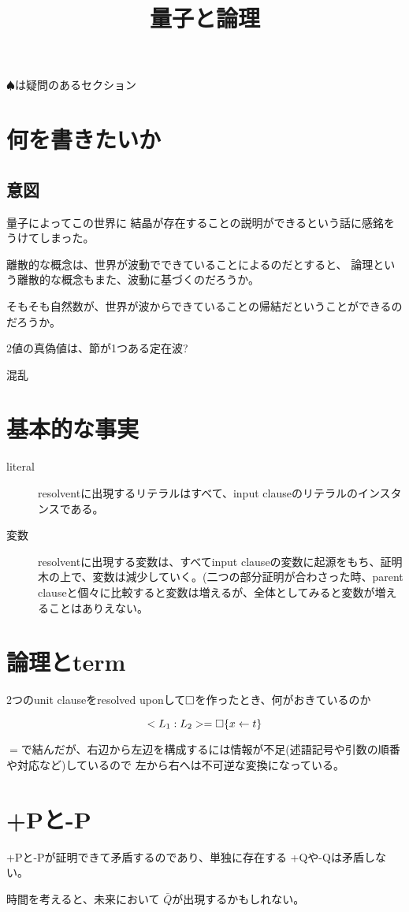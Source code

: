 \documentclass[10pt, oneside]{jarticle}   	%
\title{量子と論理}
\author{\myname}
\date{}							%
\begin{document}
\maketitle
\tableofcontents
$\spadesuit$は疑問のあるセクション
\newpage

\section{何を書きたいか}
\subsection{意図}

量子によってこの世界に 結晶が存在することの説明ができるという話に感銘をうけてしまった。

離散的な概念は、世界が波動でできていることによるのだとすると、
論理という離散的な概念もまた、波動に基づくのだろうか。

そもそも自然数が、世界が波からできていることの帰結だということができるのだろうか。

2値の真偽値は、節が1つある定在波?

混乱

% 

\section{基本的な事実}
\begin{description}
\item[ literal ] resolventに出現するリテラルはすべて、input clauseのリテラルのインスタンスである。
\item[ 変数 ] resolventに出現する変数は、すべてinput clauseの変数に起源をもち、証明木の上で、変数は減少していく。(二つの部分証明が合わさった時、parent clauseと個々に比較すると変数は増えるが、全体としてみると変数が増えることはありえない。

\end{description}

\section{論理とterm}
2つのunit clauseをresolved uponして$\Box$を作ったとき、何がおきているのか

$$<L_1:L_2> = \Box\{x \leftarrow t\}$$

$=$で結んだが、右辺から左辺を構成するには情報が不足(述語記号や引数の順番や対応など)しているので
左から右へは不可逆な変換になっている。



\section{+Pと-P}
+Pと-Pが証明できて矛盾するのであり、単独に存在する +Qや-Qは矛盾しない。

時間を考えると、未来において $\bar{Q}$が出現するかもしれない。
\end{document}
